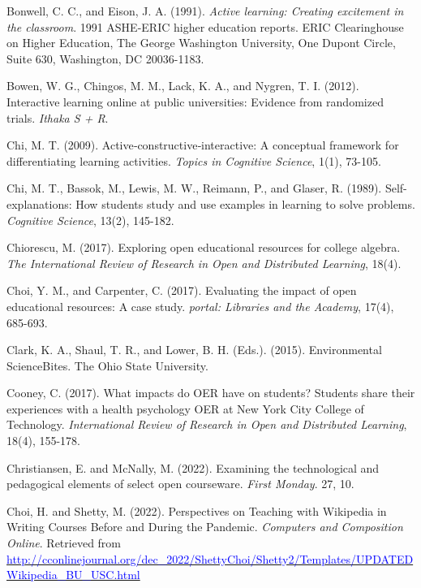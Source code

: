 \documentclass[11pt]{article}
\newcommand{\alink}[2]{\href{#1}{\textcolor{blue}{#2}}}
\begin{document}
\begin{thebibliography}{99}
   Bonwell, C. C., and Eison, J. A. (1991). {\em Active learning: Creating excitement in the classroom}. 1991 ASHE-ERIC higher education reports. ERIC Clearinghouse on Higher Education, The George Washington University, One Dupont Circle, Suite 630, Washington, DC 20036-1183.

   Bowen, W. G., Chingos, M. M., Lack, K. A., and Nygren, T. I. (2012). Interactive learning online at public universities: Evidence from randomized trials. {\em Ithaka S + R}.

   Chi, M. T. (2009). Active‐constructive‐interactive: A conceptual framework for differentiating learning activities. {\em Topics in Cognitive Science}, 1(1), 73-105.

   Chi, M. T., Bassok, M., Lewis, M. W., Reimann, P., and Glaser, R. (1989). Self-explanations: How students study and use examples in learning to solve problems. {\em Cognitive Science}, 13(2), 145-182.


   Chiorescu, M. (2017). Exploring open educational resources for college algebra. {\em The International Review of Research in Open and Distributed Learning}, 18(4).

   Choi, Y. M., and Carpenter, C. (2017). Evaluating the impact of open educational resources: A case study. {\em portal: Libraries and the Academy}, 17(4), 685-693.

   Clark, K. A., Shaul, T. R., and Lower, B. H. (Eds.). (2015). Environmental ScienceBites. The Ohio State University.

   Cooney, C. (2017). What impacts do OER have on students? Students share their experiences with a health psychology OER at New York City College of Technology. {\em International Review of Research in Open and Distributed Learning}, 18(4), 155-178.

   Christiansen, E. and McNally, M. (2022). Examining the technological and pedagogical elements of select open courseware. {\em First Monday}. 27, 10.%

   Choi, H. and Shetty, M. (2022). Perspectives on Teaching with Wikipedia in Writing Courses Before and During the Pandemic. {\em Computers and Composition Online}. Retrieved from \alink{http://cconlinejournal.org/dec\_2022/ShettyChoi/Shetty2/Templates/UPDATEDWikipedia\_BU\_USC.html}{http://cconlinejournal.org/dec\_2022/ShettyChoi/Shetty2/Templates/UPDATEDWikipedia\_BU\_USC.html}


\end{thebibliography}
\end{document}
